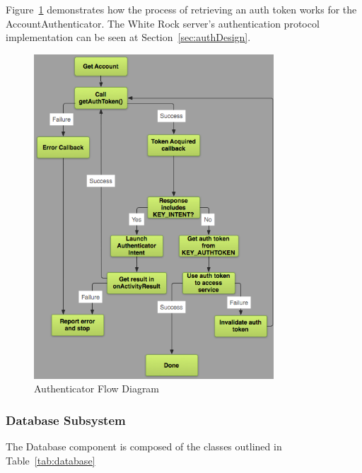 \documentclass[11pt,a4paper]{report}
\begin{document}
Figure~\ref{fig:authenticator} demonstrates how the process of retrieving an auth token works for the AccountAuthenticator. The White Rock server's authentication protocol implementation can be seen at Section~\ref{sec:authDesign}.
\begin{figure}[H]
    \centering
    \includegraphics[width=0.8\textwidth]{authenticator}
    \caption{Authenticator Flow Diagram}
    \label{fig:authenticator}
\end{figure}

\subsubsection{Database Subsystem}
\label{sec:database}
The Database component is composed of the classes outlined in Table~\ref{tab:database}
\end{document}
